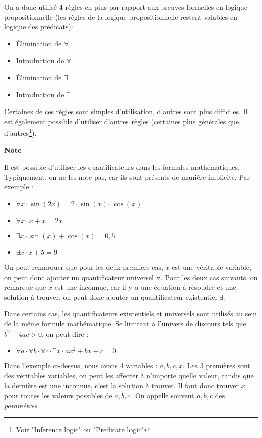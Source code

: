 On a donc utilisé 4 règles en plus par rapport aux preuves formelles en logique propositionnelle (les règles de la logique propositionnelle restent valables en logique des prédicats):
\begin{itemize}
\item Élimination de $\forall$
\item Introduction de $\forall$
\item Élimination de $\exists$
\item Introduction de $\exists$
\end{itemize}

Certaines de ces règles sont simples d'utilisation, d'autres sont plus difficiles.
Il est également possible d'utiliser d'autres règles (certaines plus générales que d'autres\footnote{Voir "Inference logic" ou "Predicate logic"}).

\begin{framed}
\textbf{Note}

Il est possible d'utiliser les quantificateurs  dans les formules mathématiques. Typiquement, on ne les note pas, car ils sont présents de manière implicite. Par exemple :
\begin{itemize}
\item $\forall x \cdot \sin(2x) = 2 \cdot \sin(x) \cdot \cos(x)$ 
\item $\forall x \cdot x + x = 2x$
\item $\exists x \cdot \sin(x) + \cos(x) = 0,5$
\item $\exists x \cdot x + 5 = 9$
\end{itemize} 

On peut remarquer que pour les deux premiers cas, $x$ est une véritable variable, on peut donc ajouter un quantificateur universel $\forall$. 
Pour les deux cas suivants, on remarque que $x$ est une inconnue, car il y a une équation à résoudre et une solution à trouver, on peut donc ajouter un quantificateur existentiel $\exists$.

Dans certains cas, les quantificateurs existentiels et universels sont
utilisés au sein de la même formule mathématique. Se limitant à
l'univers de discours tels que $ b^{2}-4ac > 0$, on peut dire :
\begin{itemize}
\item[] $\forall a \cdot \forall b \cdot \forall c \cdot \exists x \cdot ax^{2}+bx+c = 0$
\end{itemize}
Dans l'exemple ci-dessus, nous avons 4 variables : $a,b,c,x$. Les 3 premières sont des véritables variables, on peut les affecter à n'importe quelle valeur, tandis que la dernière est une inconnue, c'est la solution à trouver. Il faut donc trouver $x$ pour toutes les valeurs possibles de $a,b,c$.
On appelle souvent $a,b,c$ des {\em paramètres}.
\end{framed}

